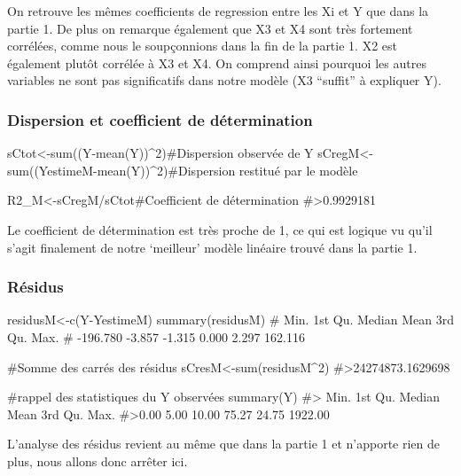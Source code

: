 On retrouve les mêmes coefficients de regression entre les Xi et Y que
dans la partie 1. De plus on remarque également que X3 et X4 sont très
fortement corrélées, comme nous le soupçonnions dans la fin de la partie
1. X2 est également plutôt corrélée à X3 et X4. On comprend ainsi
pourquoi les autres variables ne sont pas significatifs dans notre
modèle (X3 ``suffit'' à expliquer Y).

\hypertarget{dispersion-et-coefficient-de-duxe9termination-1}{%
\subsubsection{Dispersion et coefficient de
détermination}\label{dispersion-et-coefficient-de-duxe9termination-1}}

\begin{Schunk}
\begin{Sinput}
sCtot<-sum((Y-mean(Y))^2)#Dispersion observée de Y
sCregM<-sum((YestimeM-mean(Y))^2)#Dispersion restitué par le modèle

R2_M<-sCregM/sCtot#Coefficient de détermination
#>0.9929181
\end{Sinput}
\end{Schunk}

Le coefficient de détermination est très proche de 1, ce qui est logique
vu qu'il s'agit finalement de notre `meilleur' modèle linéaire trouvé
dans la partie 1.

\hypertarget{ruxe9sidus-1}{%
\subsubsection{Résidus}\label{ruxe9sidus-1}}

\begin{Schunk}
\begin{Sinput}
residusM<-c(Y-YestimeM)
summary(residusM)
#     Min.  1st Qu.   Median     Mean  3rd Qu.     Max. 
# -196.780   -3.857   -1.315    0.000    2.297  162.116 

#Somme des carrés des résidus
sCresM<-sum(residusM^2)
#>24274873.1629698

#rappel des statistiques du Y observées
summary(Y)
#> Min.   1st Qu.  Median   Mean  3rd Qu. Max. 
#>0.00    5.00   10.00   75.27   24.75 1922.00
\end{Sinput}
\end{Schunk}

L'analyse des résidus revient au même que dans la partie 1 et n'apporte
rien de plus, nous allons donc arrêter ici.

